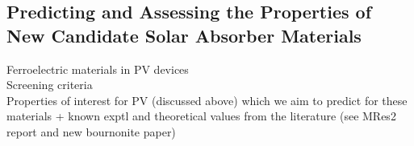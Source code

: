 \subsection{Predicting and Assessing the Properties of New Candidate Solar Absorber Materials}
Ferroelectric materials in PV devices\\
Screening criteria\\
Properties of interest for PV (discussed above) which we aim to predict for these materials + known exptl and theoretical values from the literature (see MRes2 report and new bournonite paper)



